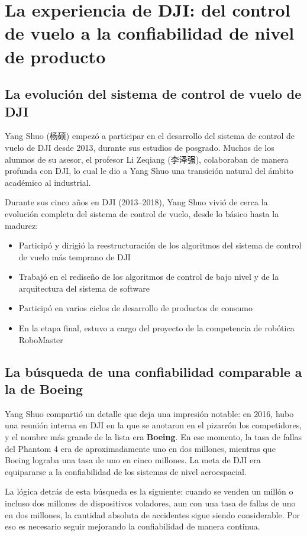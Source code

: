\documentclass[a4paper]{article}
\begin{document}
\section{La experiencia de DJI: del control de vuelo a la confiabilidad de nivel de producto}

\subsection{La evolución del sistema de control de vuelo de DJI}

Yang Shuo (杨硕) empezó a participar en el desarrollo del sistema de control de vuelo de DJI desde 2013, durante sus estudios de posgrado. Muchos de los alumnos de su asesor, el profesor Li Zeqiang (李泽强), colaboraban de manera profunda con DJI, lo cual le dio a Yang Shuo una transición natural del ámbito académico al industrial.

Durante sus cinco años en DJI (2013--2018), Yang Shuo vivió de cerca la evolución completa del sistema de control de vuelo, desde lo básico hasta la madurez:
\begin{itemize}
    \item Participó y dirigió la reestructuración de los algoritmos del sistema de control de vuelo más temprano de DJI
    \item Trabajó en el rediseño de los algoritmos de control de bajo nivel y de la arquitectura del sistema de software
    \item Participó en varios ciclos de desarrollo de productos de consumo
    \item En la etapa final, estuvo a cargo del proyecto de la competencia de robótica RoboMaster
\end{itemize}

\subsection{La búsqueda de una confiabilidad comparable a la de Boeing}

Yang Shuo compartió un detalle que deja una impresión notable: en 2016, hubo una reunión interna en DJI en la que se anotaron en el pizarrón los competidores, y el nombre más grande de la lista era \textbf{Boeing}. En ese momento, la tasa de fallas del Phantom 4 era de aproximadamente uno en dos millones, mientras que Boeing lograba una tasa de uno en cinco millones. La meta de DJI era equipararse a la confiabilidad de los sistemas de nivel aeroespacial.

La lógica detrás de esta búsqueda es la siguiente: cuando se venden un millón o incluso dos millones de dispositivos voladores, aun con una tasa de fallas de uno en dos millones, la cantidad absoluta de accidentes sigue siendo considerable. Por eso es necesario seguir mejorando la confiabilidad de manera continua.
\end{document}
